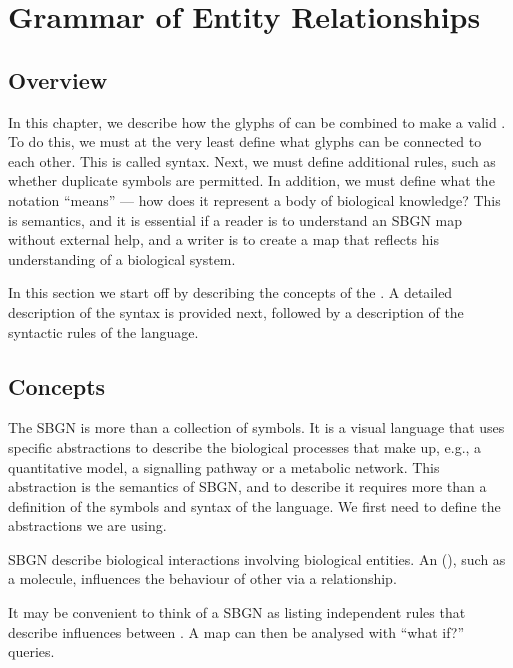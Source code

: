 \chapter{Grammar of Entity Relationships}
\label{chp:grammar}

\section{Overview}

In this chapter, we describe how the glyphs of \SBGNERLone can be combined
to make a valid \ERm{}. To do this, we must at the very least
define what glyphs can be connected to each other. This is called
syntax. Next, we must define additional rules, such as whether duplicate symbols are permitted. In addition, we must define what the notation ``means'' --- how does it represent a body of biological knowledge? This is semantics, and it is essential if a reader is to understand an SBGN map without external help, and a writer is to create a map that reflects his understanding of a biological system.

In this section we start off by describing the concepts of the
\ERl{}. A detailed description of the syntax is provided next,
followed by a description of the syntactic rules of the language.

\section{Concepts}

The SBGN \ERl{} is more than a collection of symbols. It is a
visual language that uses specific abstractions to describe the
biological processes that make up, e.g., a quantitative model, a signalling pathway or a metabolic network. This abstraction is the semantics of SBGN, and to describe it requires more than a definition
of the symbols and syntax of the language. We first need to define the
abstractions we are using.

SBGN \ERs{} describe biological interactions involving biological entities. An  (), such as a molecule, influences the behaviour of other  via a relationship. 

It may be convenient to think of a SBGN \ERs{} as listing independent rules that describe influences between . A map can then be analysed with ``what if?'' queries. 





